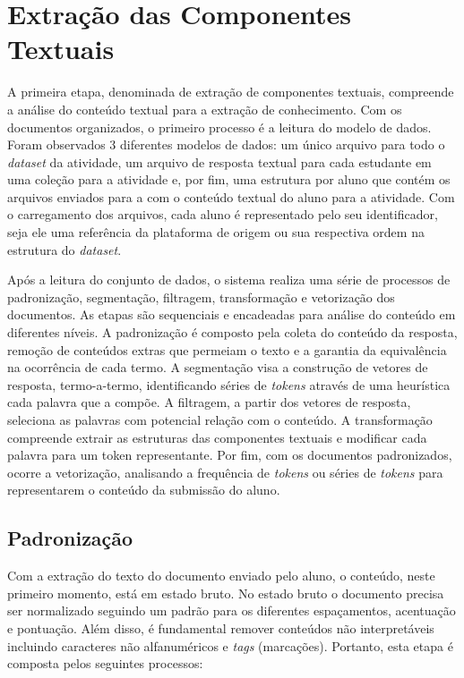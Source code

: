\section{Extração das Componentes Textuais}
A primeira etapa, denominada de extração de componentes textuais, compreende a análise do conteúdo textual para a extração de conhecimento. Com os documentos organizados, o primeiro processo é a leitura do modelo de dados. Foram observados 3 diferentes modelos de dados: um único arquivo para todo o \textit{dataset} da atividade, um arquivo de resposta textual para cada estudante em uma coleção para a atividade e, por fim, uma estrutura por aluno que contém os arquivos enviados para a com o conteúdo textual do aluno para a atividade. Com o carregamento dos arquivos, cada aluno é representado pelo seu identificador, seja ele uma referência da plataforma de origem ou sua respectiva ordem na estrutura do \textit{dataset}.

Após a leitura do conjunto de dados, o sistema realiza uma série de processos de padronização, segmentação, filtragem, transformação e vetorização dos documentos. As etapas são sequenciais e encadeadas para análise do conteúdo em diferentes níveis. A padronização é composto pela coleta do conteúdo da resposta, remoção de conteúdos extras que permeiam o texto e a garantia da equivalência na ocorrência de cada termo. A segmentação visa a construção de vetores de resposta, termo-a-termo, identificando séries de \textit{tokens} através de uma heurística cada palavra que a compõe. A filtragem, a partir dos vetores de resposta, seleciona as palavras com potencial relação com o conteúdo. A transformação compreende extrair as estruturas das componentes textuais e modificar cada palavra para um token representante. Por fim, com os documentos padronizados, ocorre a vetorização, analisando a frequência de \textit{tokens} ou séries de \textit{tokens} para representarem o conteúdo da submissão do aluno.

\subsection{Padronização}
Com a extração do texto do documento enviado pelo aluno, o conteúdo, neste primeiro momento, está em estado bruto. No estado bruto o documento precisa ser normalizado seguindo um padrão para os diferentes espaçamentos, acentuação e pontuação. Além disso, é fundamental remover conteúdos não interpretáveis incluindo caracteres não alfanuméricos e \textit{tags} (marcações). Portanto, esta etapa é composta pelos seguintes processos:

